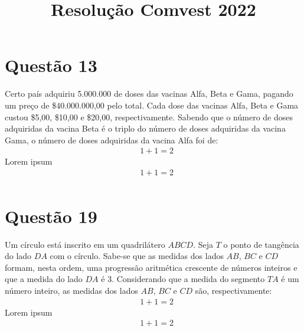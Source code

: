 \documentclass[12pt]{article}
\begin{document}
\title{Resolução Comvest 2022}
\date{}
\maketitle
\section*{Questão 13}
Certo país adquiriu 5.000.000 de doses das vacinas Alfa,
Beta e Gama, pagando um preço de \$40.000.000,00 pelo
total. Cada dose das vacinas Alfa, Beta e Gama custou
\$5,00, \$10,00 e \$20,00, respectivamente. Sabendo que o
número de doses adquiridas da vacina Beta é o triplo do
número de doses adquiridas da vacina Gama, o número de
doses adquiridas da vacina Alfa foi de:
\begin{align*}
  &1+1=2
\end{align*}
Lorem ipsum
\begin{align*}
  &1+1=2
\end{align*}
\begin{align*}
\end{align*}
\section*{Questão 19}
Um círculo está inscrito em um quadrilátero $ABCD$. Seja $T$ o
ponto de tangência do lado $DA$ com o círculo. Sabe-se que
as medidas dos lados $AB$, $BC$ e $CD$ formam, nesta ordem,
uma progressão aritmética crescente de números inteiros e
que a medida do lado $DA$ é 3. Considerando que a medida
do segmento $TA$ é um número inteiro, as medidas dos
lados $AB$, $BC$ e $CD$ são, respectivamente:
\begin{align*}
  &1+1=2
\end{align*}
Lorem ipsum
\begin{align*}
  &1+1=2
\end{align*}
\begin{align*}
\end{align*}
\end{document}
